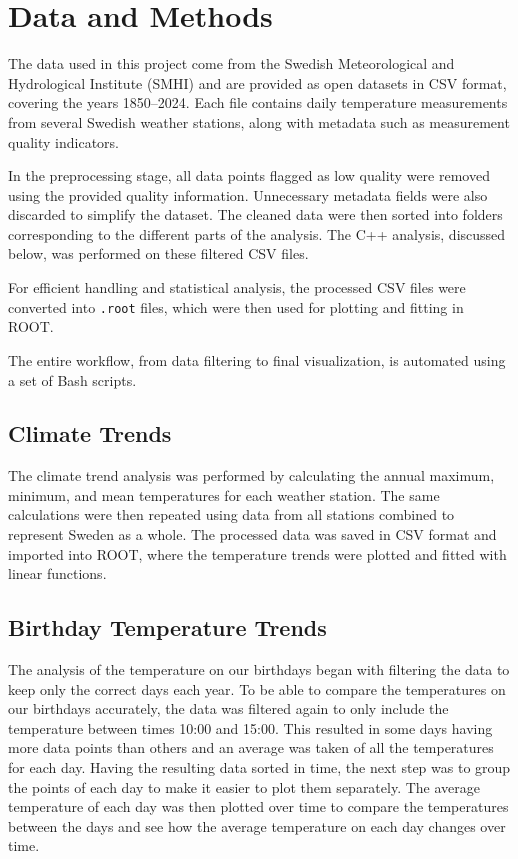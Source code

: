 \section{Data and Methods}

The data used in this project come from the Swedish Meteorological and Hydrological Institute (SMHI) and are provided as open datasets in CSV format, covering the years 1850–2024. Each file contains daily temperature measurements from several Swedish weather stations, along with metadata such as measurement quality indicators.

In the preprocessing stage, all data points flagged as low quality were removed using the provided quality information. Unnecessary metadata fields were also discarded to simplify the dataset. The cleaned data were then sorted into folders corresponding to the different parts of the analysis. The C++ analysis, discussed below, was performed on these filtered CSV files.

For efficient handling and statistical analysis, the processed CSV files were converted into \texttt{.root} files, which were then used for plotting and fitting in ROOT.

The entire workflow, from data filtering to final visualization, is automated using a set of Bash scripts.

\subsection{Climate Trends}
The climate trend analysis was performed by calculating the annual maximum, minimum, and mean temperatures for each weather station. The same calculations were then repeated using data from all stations combined to represent Sweden as a whole. The processed data was saved in CSV format and imported into ROOT, where the temperature trends were plotted and fitted with linear functions.

\subsection{Birthday Temperature Trends}
The analysis of the temperature on our birthdays began with filtering the data to keep only the correct days each year. To be able to compare the temperatures on our birthdays accurately, the data was filtered again to only include the temperature between times 10:00 and 15:00. This resulted in some days having more data points than others and an average was taken of all the temperatures for each day. Having the resulting data sorted in time, the next step was to group the points of each day to make it easier to plot them separately. The average temperature of each day was then plotted over time to compare the temperatures between the days and see how the average temperature on each day changes over time. 


